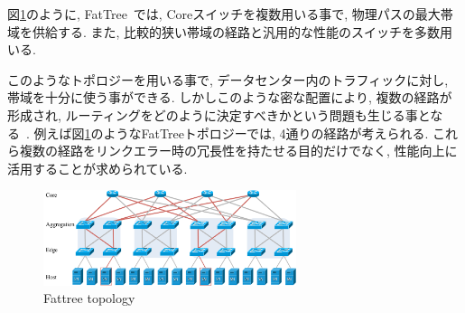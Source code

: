 \documentclass[11pt, a4paper, uplatex]{jsarticle}
\begin{document}
図\ref{fig:fattree}のように, FatTree~\cite{fattree}では, Coreスイッチを複数用いる事で,
物理パスの最大帯域を供給する.
また, 比較的狭い帯域の経路と汎用的な性能のスイッチを多数用いる.

このようなトポロジーを用いる事で, データセンター内のトラフィックに対し, 帯域を十分に使う事ができる.
しかしこのような密な配置により, 複数の経路が形成され, ルーティングをどのように決定すべきかという問題も生じる事となる~\cite{improving}.
例えば図\ref{fig:fattree}のようなFatTreeトポロジーでは, 4通りの経路が考えられる.
これら複数の経路をリンクエラー時の冗長性を持たせる目的だけでなく, 性能向上に活用することが求められている.
\begin{figure}[h]
    \begin{center}
    \includegraphics[autoebb, width=210pt]{./img/fattree_topology.pdf}
    \caption{Fattree topology}
    \label{fig:fattree}
    \end{center}
\end{figure}

\end{document}
